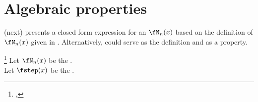 \section{Algebraic properties}
 (next) presents a closed form expression for an  $\fN_n(x)$
based on the definition of $\fN_n(x)$ given in .
Alternatively,  could serve as the definition and  as a property.
\begin{theorem}
\footnote{
  ,
  }
\label{thm:Nnx}
Let $\fN_n(x)$ be the  .\\
Let $\fstep(x)$ be the  .
\end{theorem}
